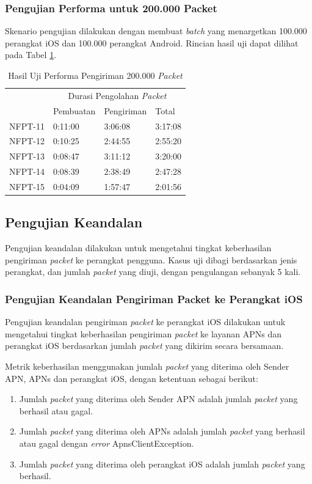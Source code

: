 \subsubsection{Pengujian Performa untuk 200.000 Packet}
\par Skenario pengujian dilakukan dengan membuat \textit{batch} yang menargetkan 100.000 perangkat iOS dan 100.000 perangkat Android. Rincian hasil uji dapat dilihat pada Tabel \ref{t:performa-200k}.
\begin{longtable}{|p{1.5cm}|p{2cm}|p{2cm}|p{2cm}|}
\caption{Hasil Uji Performa Pengiriman 200.000 \textit{Packet}} \label{t:performa-200k} \\ \hline
\rowcolor{lightgray} & \multicolumn{3}{c|}{Durasi Pengolahan \textit{Packet}} \\ \hhline{~|*3{-}|}
\rowcolor{lightgray} \multirow{-2}{*}{Kode} & Pembuatan & Pengiriman & Total \\ \hline
	NFPT-11 & 0:11:00 & 3:06:08 & 3:17:08 \\ \hline 
	NFPT-12 & 0:10:25 & 2:44:55 & 2:55:20 \\ \hline
	NFPT-13 & 0:08:47 & 3:11:12 & 3:20:00 \\ \hline
	NFPT-14 & 0:08:39 & 2:38:49 & 2:47:28 \\ \hline
	NFPT-15 & 0:04:09 & 1:57:47 & 2:01:56 \\ \hline
\end{longtable}

\subsection{Pengujian Keandalan}
\par Pengujian keandalan dilakukan untuk mengetahui tingkat keberhasilan pengiriman \textit{packet} ke perangkat pengguna. Kasus uji dibagi berdasarkan jenis perangkat, dan jumlah \textit{packet} yang diuji, dengan pengulangan sebanyak 5 kali.

\subsubsection{Pengujian Keandalan Pengiriman Packet ke Perangkat iOS}
\par Pengujian keandalan pengiriman \textit{packet} ke perangkat iOS dilakukan untuk mengetahui tingkat keberhasilan pengiriman \textit{packet} ke layanan APNs dan perangkat iOS berdasarkan jumlah \textit{packet} yang dikirim secara bersamaan.
\par Metrik keberhasilan menggunakan jumlah \textit{packet} yang diterima oleh Sender APN, APNs dan perangkat iOS, dengan ketentuan sebagai berikut:
\begin{enumerate}
	\item Jumlah \textit{packet} yang diterima oleh Sender APN adalah jumlah \textit{packet} yang berhasil atau gagal.
	\item Jumlah \textit{packet} yang diterima oleh APNs adalah jumlah \textit{packet} yang berhasil atau gagal dengan \textit{error} ApnsClientException.
	\item Jumlah \textit{packet} yang diterima oleh perangkat iOS adalah jumlah \textit{packet} yang berhasil.
\end{enumerate}
   

